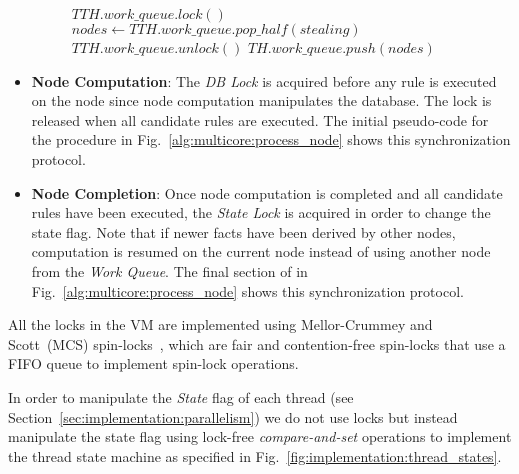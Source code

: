 \begin{itemize}
\begin{figure}
\begin{algorithm}[H]
   $TTH.work\_queue.lock()$\;
   $nodes \longleftarrow TTH.work\_queue.pop\_half(stealing)$\;
   $TTH.work\_queue.unlock()$\;
   $TH.work\_queue.push(nodes)$\;
\end{algorithm}
 \label{alg:multicore:steal_nodes}
\end{figure}

   \item \textbf{Node Computation}: The \emph{DB Lock} is acquired before any
      rule is executed on the node since node computation manipulates the
      database. The lock is released when all candidate rules are executed. The
      initial pseudo-code for the  procedure in
      Fig.~\ref{alg:multicore:process_node} shows this synchronization protocol.

   \item \textbf{Node Completion}: Once node computation is completed and all
      candidate rules have been executed, the \emph{State Lock} is acquired in
      order to change the state flag. Note that if newer facts have been derived
      by other nodes, computation is resumed on the current node instead of
      using another node from the \emph{Work Queue}. The final section of
       in Fig.~\ref{alg:multicore:process_node} shows this
      synchronization protocol.

\end{itemize}

All the locks in the VM are implemented using Mellor-Crummey and Scott~(MCS)
spin-locks~\cite{Mellor-Crummey:1991}, which are fair and contention-free
spin-locks that use a FIFO queue to implement spin-lock operations.

In order to manipulate the \emph{State} flag of each thread (see
Section~\ref{sec:implementation:parallelism}) we do not use locks but instead
manipulate the state flag using lock-free \emph{compare-and-set} operations to
implement the thread state machine as specified in
Fig.~\ref{fig:implementation:thread_states}.

